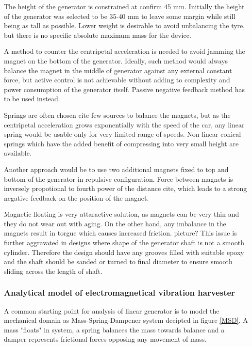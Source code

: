 The height of the generator is constrained at  {\color{yellow} confirm} 45 mm. Initially the height of {\color{gray} the} generator was selected to be 35-40 mm to leave some margin while still being as tall as possible. Lower weight is desirable to avoid unbalancing the tyre, but there is no specific absolute maximum mass for the device. 

A method to counter the centripetal acceleration is needed to avoid jamming the magnet on the bottom of the generator. Ideally, such method would always balance the magnet in the middle of generator against any external constant force, but active control is not achievable without adding to complexity and power consumption of the generator itself. Passive negative feedback method has to be used instead. 

Springs are often chosen {\color{red} cite few sources} to balance the magnets, but as the centripetal acceleration grows exponentially with the speed of the car, any linear spring would be usable only for very limited range of speeds. Non-linear conical springs which have the added benefit of compressing into very small height are available.

Another approach would be to use two additional magnets fixed to top and bottom of the generator in repulsive configuration. Force between magnets is inversely propotional to fourth power of the distance {\color{red} cite}, which leads to a strong negative feedback on the position of the magnet. 

Magnetic floating is very attaractive solution, as magnets can be very thin and they do not wear out with aging. On the other hand, any imbalance in the magnets result in torgue which causes increased friction. {\color{yellow} picture?} This issue is further aggravated in designs where shape of the generator shaft is not a smooth cylinder. Therefore the design should have any grooves filled with suitable epoxy and the shaft should be sanded or turned to final diameter to ensure smooth sliding across the length of shaft.

\subsubsection{Analytical model of electromagnetical vibration harvester}
A common starting point for analysis of linear generator is to model the mechanical domain as Mass-Spring-Dampener system decipted in figure \ref{MSD}. A mass "floats" in system, a spring balances the mass towards balance and a damper represents frictional forces opposing any movement of mass. 


